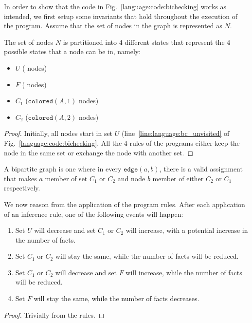 In order to show that the code in Fig.~\ref{language:code:bichecking} works as
intended, we first setup some invariants that hold throughout the execution of
the program. Assume that the set of nodes in the graph is represented as $N$.

\noindent\begin{minipage}{\linewidth}
\begin{invariant}
The set of nodes $N$ is partitioned into 4 different states that represent the 4
possible states that a node can be in, namely:

\begin{itemize}
   \item $U$ ( nodes)
   \item $F$ ( nodes)
   \item $C_{1}$ ($\mathtt{colored}(A, 1)$ nodes)
   \item $C_{2}$ ($\mathtt{colored}(A, 2)$ nodes)
\end{itemize}
\end{invariant}
\end{minipage}
\begin{proof}
Initially, all nodes start in set $U$ (line~\ref{line:language:bc_unvisited}
of Fig.~\ref{language:code:bichecking}. All the 4 rules of the programs either
keep the node in the same set or exchange the node with another set.
\end{proof}

A bipartite graph is one where in every $\mathtt{edge}(a, b)$, there is a valid
   assignment that makes $a$ member of set $C_{1}$ or $C_{2}$ and node
   $b$ member of either $C_{2}$ or $C_{1}$ respectively.

\begin{variant}\label{language:lemma:bipartite_convergence}

   We now reason from the application of the program rules. After each
   application of an inference rule, one of the following events will happen:

   \begin{enumerate}
      \item Set $U$ will decrease and set $C_{1}$ or $C_{2}$ will
         increase, with a potential increase in the number of 
         facts.

      \item Set $C_{1}$ or $C_{2}$ will stay the same, while the number
         of  facts will be reduced.

      \item Set $C_{1}$ or $C_{2}$ will decrease and set $F$ will
         increase, while the number of  facts will be reduced.

      \item Set $F$ will stay the same, while the number of  facts
         decreases.
   \end{enumerate}

\end{variant}
\begin{proof}
Trivially from the rules.
\end{proof}

